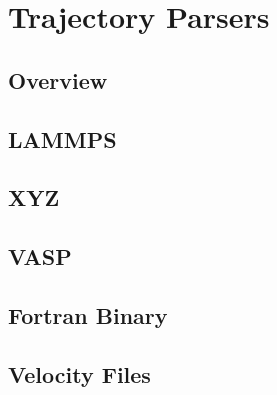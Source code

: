 \newpage
\section{Trajectory Parsers}

\subsection{Overview}

\subsection{LAMMPS}
\subsection{XYZ}
\subsection{VASP}
\subsection{Fortran Binary}

\subsection{Velocity Files}

